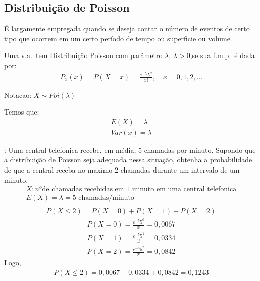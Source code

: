 \subsection{Distribuição de Poisson}
\begin{description}
  \item É largamente empregada quando se deseja contar o número de eventos de certo tipo
que ocorrem em um certo período de tempo ou superficie ou volume.
\item[Definicao] Uma v.a.\ tem Distribuição Poisson com parâmetro $\lambda$, $\lambda >0$,se sua
  f.m.p.\ é dada por:
 \begin{align}
   P_{x} (x)= P(X=x)= \frac{e^{-\lambda}\lambda^{x}}{x!}, \quad x=0,1,2,\ldots
 \end{align} 
 \item{Notacao}: $X \mathtt{\sim} Poi(\lambda)$
 \item{Temos que}:
   \begin{align}
     E(X)= \lambda \\
     Var(x)= \lambda
   \end{align}
   \item[Exemplo]: Uma central telefonica recebe, em média, 5 chamadas por minuto.
     Supondo que a distribuição de Poisson seja adequada nessa situação, obtenha a 
     probabilidade de que a central receba no maximo 2 chamadas durante um intervalo
     de um minuto.
     \begin{align*}
       X: n^{o} \text{de chamadas recebidas em 1 minuto em uma central telefonica}
       \\
       E(X)=\lambda= \text{5 chamadas/minuto}\\
     \end{align*}
     \begin{align*}
       P(X \leq 2)= P(X=0)+ P(X=1)+P(X=2)
     \end{align*}
     \begin{align*}
       P(X=0) = \frac{e^{-5}5^0}{0!}= 0,0067\\
       P(X=1) = \frac{e^{-5}5^1}{1!}= 0,0334\\
       P(X=2) = \frac{e^{-5}5^2}{2!}= 0,0842
     \end{align*}
     Logo,
     \begin{align*}
       P(X \leq 2)= 0,0067+0,0334+0,0842=0,1243
     \end{align*}
   \end{description}
